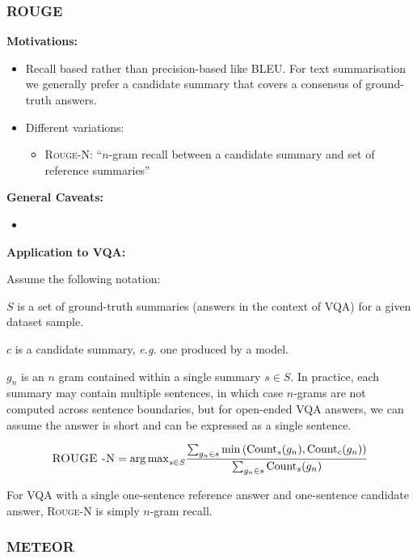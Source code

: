 \subsubsection{ROUGE}

\textbf{Motivations:}

\begin{itemize}
    \item Recall based rather than precision-based like BLEU. For text summarisation we generally prefer a candidate summary that covers a consensus of ground-truth answers.
    \item Different variations:
    \begin{itemize}
        \item \textsc{Rouge-N}: ``\(n\)-gram recall between a candidate summary and set of reference summaries''
    \end{itemize}
\end{itemize}

\textbf{General Caveats:}

\begin{itemize}
    \item 
\end{itemize}

\textbf{Application to VQA:}

Assume the following notation:

\(S\) is a set of ground-truth summaries (answers in the context of VQA) for a given dataset sample.

\(c\) is a candidate summary, \textit{e.g.} one produced by a model.

\(g_n\) is an \(n\) gram contained within a single summary \(s \in S\). In practice, each summary may contain multiple sentences, in which case \(n\)-grams are not computed across sentence boundaries, but for open-ended VQA answers, we can assume the answer is short and can be expressed as a single sentence.

\begin{equation*}
    \textsc{ROUGE -N} = {\arg \max}_{s\in S} \frac{
        \sum_{g_n \in s} \min \left(\text{Count}_s(g_n), \text{Count}_c(g_n) \right)
    }{
        \sum_{g_n \in s} \text{Count}_s(g_n)
    }
\end{equation*}

For VQA with a single one-sentence reference answer and one-sentence candidate answer, \textsc{Rouge-N} is simply \(n\)-gram recall.

\subsubsection{METEOR}

